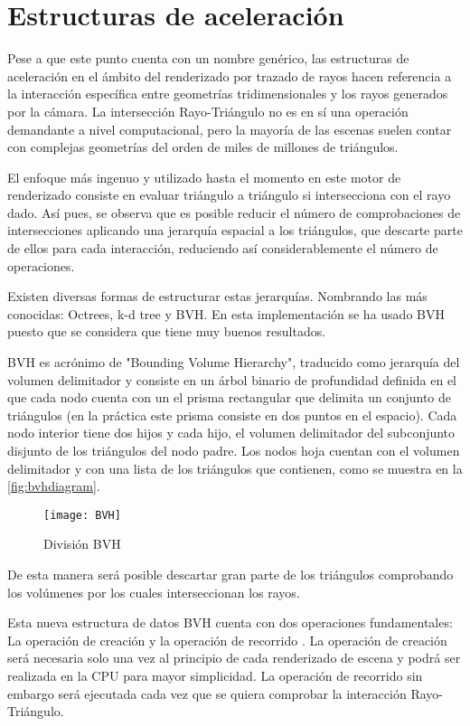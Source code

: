 \section{Estructuras de aceleración}
\label{BVH}
	
Pese a que este punto cuenta con un nombre genérico, las estructuras de aceleración en el ámbito del renderizado por trazado de rayos hacen referencia a la interacción específica entre geometrías tridimensionales y los rayos generados por la cámara. La intersección Rayo-Triángulo no es en sí una operación demandante a nivel computacional, pero la mayoría de las escenas suelen contar con complejas geometrías del orden de miles de millones de triángulos.

El enfoque más ingenuo y utilizado hasta el momento en este motor de renderizado consiste en evaluar triángulo a triángulo si intersecciona con el rayo dado. Así pues, se observa que es posible reducir el número de comprobaciones de intersecciones aplicando una jerarquía espacial a los triángulos, que descarte parte de ellos para cada interacción, reduciendo así considerablemente el número de operaciones.

Existen diversas formas de estructurar estas jerarquías. Nombrando las más conocidas: Octrees, k-d tree y BVH. En esta implementación se ha usado BVH puesto que se considera que tiene muy buenos resultados.

BVH es acrónimo de "Bounding Volume Hierarchy", traducido como jerarquía del volumen delimitador y consiste en un árbol binario de profundidad definida en el que cada nodo cuenta con un el prisma rectangular que delimita un conjunto de triángulos (en la práctica este prisma consiste en dos puntos en el espacio). Cada nodo interior tiene dos hijos y cada hijo, el volumen delimitador del subconjunto disjunto de los triángulos del nodo padre. Los nodos hoja cuentan con el volumen delimitador y con una lista de los triángulos que contienen, como se muestra en la \autoref{fig:bvhdiagram}.

\begin{figure}[H]
    \centering
	\texttt{[image: BVH]}
	\caption{División BVH}
	\label{fig:bvhdiagram}
\end{figure}

De esta manera será posible descartar gran parte de los triángulos comprobando los volúmenes por los cuales interseccionan los rayos.

Esta nueva estructura de datos BVH cuenta con dos operaciones fundamentales: La operación de creación  y la operación de recorrido . La operación de creación será necesaria solo una vez al principio de cada renderizado de escena y podrá ser realizada en la CPU para mayor simplicidad. La operación de recorrido sin embargo será ejecutada cada vez que se quiera comprobar la interacción Rayo-Triángulo.


